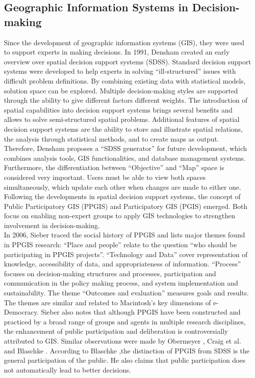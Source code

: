 \subsection{Geographic Information Systems in Decision-making}
\label{subchap:gis_stuff}
Since the development of geographic information systems (GIS), they were used to support experts in making decisions. In 1991, Densham \cite{densham_sdss} created an early overview over spatial decision support systems (SDSS). Standard decision support systems were developed to help experts in solving ``ill-structured'' issues with difficult problem definitions. By combining existing data with statistical models, solution space can be explored. Multiple decision-making styles are supported through the ability to give different factors different weights. The introduction of spatial capabilities into decision support systems brings several benefits and allows to solve semi-structured spatial problems. Additional features of spatial decision support systems are the ability to store and illustrate spatial relations, the analysis through statistical methods, and to create maps as output. Therefore, Densham proposes a ``SDSS generator'' for future development, which combines analysis tools, GIS functionalities, and database management systems. Furthermore, the differentiation between ``Objective'' and ``Map'' space is considered very important. Users must be able to view both spaces simultaneously, which update each other when changes are made to either one.\\
Following the developments in spatial decision support systems, the concept of Public Participatory GIS (PPGIS) and Participatory GIS (PGIS) emerged. Both focus on enabling non-expert groups to apply GIS technologies to strengthen involvement in decision-making.\\
In 2006, Sieber \cite{Sieber2006_PublicParticipationGIS} traced the social history of PPGIS and lists major themes found in PPGIS research: ``Place and people'' relate to the question ``who should be participating in PPGIS projects''. ``Technology and Data'' cover representation of knowledge, accessibility of data, and appropriateness of information. ``Process'' focuses on decision-making structures and processes, participation and communication in the policy making process, and system implementation and sustainability. The  theme ``Outcomes and evaluation'' measures goals and results. The themes are similar and related to Macintosh's \cite{Macintosh2004_eParticipation_characterization} key dimensions of e-Democracy. Sieber also notes that although PPGIS have been constructed and practiced by a broad range of groups and agents in multiple research disciplines, the enhancement of public participation and deliberation is controversially attributed to GIS. Similar observations were made by Obermeyer \cite{obermeyer1998evolution}, Craig et al. \cite{Weiner2002_Participation_and_GIS_eigentlich_Craig} and Blaschke \cite{Blaschke2004_PGIS_critically_revised}. According to Blaschke ,the distinction of PPGIS from SDSS is the general participation of the public. He also claims that public participation does not automatically lead to better decisions.\\
